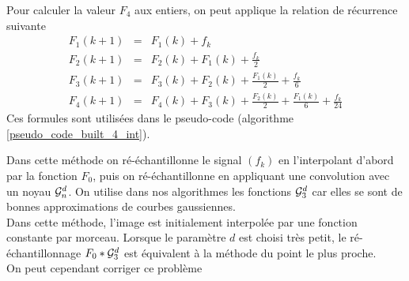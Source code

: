 Pour calculer la valeur $F_4$ aux entiers, on peut applique la relation de récurrence suivante
\begin{eqnarray*}
F_{1}(k+1)&=&  F_{1}(k)+f_{k}  \\
F_{2}(k+1)&=&  F_{2}(k)+F_{1}(k)+\frac{f_{k}}{2}   \\
F_{3}(k+1)&=&  F_{3}(k)+F_{2}(k)+\frac{F_{1}(k)}{2}+\frac{f_{k}}{6}   \\
F_{4}(k+1)&=&  F_{4}(k)+F_{3}(k)+\frac{F_{2}(k)}{2}+\frac{F_{1}(k)}{6}+\frac{f_{k}}{24}  
\end{eqnarray*}
Ces formules sont utilisées dans le pseudo-code (algorithme \ref{pseudo_code_built_4_int}).

Dans cette méthode on ré-échantillonne le signal $(f_k)$ en l'interpolant d'abord par la fonction $F_{0}$, puis on ré-échantillonne en appliquant une convolution avec un noyau $\mathcal{G}_n^d$. On utilise dans nos algorithmes les fonctions $\mathcal{G}_3^d$ car elles se sont de bonnes approximations de courbes gaussiennes.\\ %
Dans cette méthode, l'image est initialement interpolée par une fonction constante par morceau. Lorsque le paramètre $d$ est choisi très petit, le ré-échantillonnage $F_{0}*\mathcal{G}_3^d$ est équivalent à la méthode du point le plus proche.\\
On peut cependant corriger ce problème

